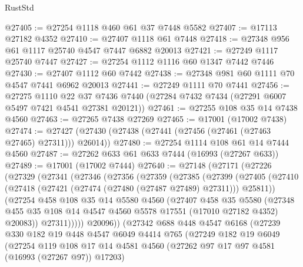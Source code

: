 \begin{lexlean}{RustStd}
\begin{coremodule}
{\begin{coremodule}
{{{{{{{{{{{{{{{{{{{{{{{{{{{{{{{{{{{{{{{{{{{{{{{{{{{{{{{@27405 := @27254 @1118 @460 @61 @37 @7448 @5582
@27407 := @17113 @27182 @4352
@27410 := @27407 @1118 @61 @7448
@27418 := @27348 @956 @61 @1117 @25740 @4547 @7447 @6882 @20013
@27421 := @27249 @1117 @25740 @7447
@27427 := @27254 @1112 @1116 @60 @1347 @7442 @7446
@27430 := @27407 @1112 @60 @7442
@27438 := @27348 @981 @60 @1111 @70 @4547 @7441 @6962 @20013
@27441 := @27249 @1111 @70 @7441
@27456 := @27275
    @1110
    @22
    @37
    @7436
    @7440
    (@27284 @7432 @7434 (@27291 @6007 @5497 @7421 @4541 @27381 @20121))
@27461 := @27255 @108 @35 @14 @7438 @4560
@27463 := @27265 @7438 @27269
@27465 := @17001 (@17002 @7438)
@27474 := @27427 (@27430 (@27438 (@27441 (@27456 (@27461 (@27463 @27465) @27311))) @26014))
@27480 := @27254 @1114 @108 @61 @14 @7444 @4560
@27487 := @27262 @633 @61 @633 @7444 (@16993 (@27267 @633))
@27489 := @17001 (@17002 @7444)
@27640 := @27148
    (@27171
      (@27226
        (@27329
          (@27341
            (@27346
              (@27356
                (@27359
                  (@27385
                    (@27399
                      (@27405
                        (@27410 (@27418 (@27421 (@27474 (@27480 (@27487 @27489) @27311))) @25811))
                        (@27254
                          @458
                          @108
                          @35
                          @14
                          @5580
                          @4560
                          (@27407
                            @458
                            @35
                            @5580
                            (@27348
                              @455
                              @35
                              @108
                              @14
                              @4547
                              @4560
                              @5578
                              @17551
                              (@17010 @27182 @4352)
                              @20083))
                          @27311)))))
                @20096))
            (@27342
              @688
              @448
              @4547
              @6168
              (@27239
                @330
                @182
                @19
                @448
                @4547
                @6049
                @4414
                @765
                (@27249
                  @182
                  @19
                  @6049
                  (@27254
                    @119
                    @108
                    @17
                    @14
                    @4581
                    @4560
                    (@27262 @97 @17 @97 @4581 (@16993 (@27267 @97)) @17203)
}}}}}}}}}}}}}}}}}}}}}}}}}}}}}}}}}}}}}}}}}}}}}}}}}}}}}}}
\end{coremodule}}
\end{coremodule}
\end{lexlean}
